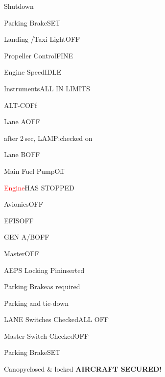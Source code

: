 \begin{checklist}{Shutdown}
  \item{Parking Brake}{SET}
  \item{Landing-/Taxi-Light}{OFF}
  \item{Propeller Control}{FINE}
  \item{Engine Speed}{IDLE}
  \item{Instruments}{ALL IN LIMITS}
  \item{ALT-C}{OFf}
  \item{Lane A}{OFF}
  \item{after 2\,sec, LAMP:}{checked on}
  \item{Lane B}{OFF}
  \item{Main Fuel Pump}{Off}
  \item{\textcolor{red}{Engine}}{HAS STOPPED}
  \item{Avionics}{OFF}
  \item{EFIS}{OFF}
  \item{GEN A/B}{OFF}
  \item{Master}{OFF}
  \item{AEPS Locking Pin}{inserted}
  \item{Parking Brake}{as required}
\end{checklist}

\begin{checklist}{Parking and tie-down}
  \item{LANE Switches Checked}{ALL OFF}
  \item{Master Switch Checked}{OFF}
  \item{Parking Brake}{SET}
  \item{Canopy}{closed \& locked}
  \textbf{AIRCRAFT SECURED!}
\end{checklist}


